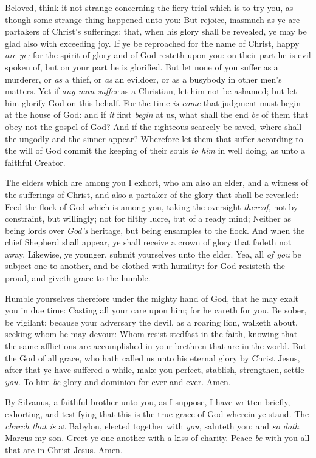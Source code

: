 \documentclass[11pt,letterpaper,oneside]{memoir}
\begin{document}
Beloved, think it not strange concerning the fiery trial which is to try
you, as though some strange thing happened unto you: But rejoice,
inasmuch as ye are partakers of Christ's sufferings; that, when his
glory shall be revealed, ye may be glad also with exceeding joy. If ye
be reproached for the name of Christ, happy \emph{are ye;} for the
spirit of glory and of God resteth upon you: on their part he is evil
spoken of, but on your part he is glorified. But let none of you suffer
as a murderer, or \emph{as} a thief, or \emph{as} an evildoer, or as a
busybody in other men's matters. Yet if \emph{any man suffer} as a
Christian, let him not be ashamed; but let him glorify God on this
behalf. For the time \emph{is come} that judgment must begin at the
house of God: and if \emph{it} first \emph{begin} at us, what shall the
end \emph{be} of them that obey not the gospel of God? And if the
righteous scarcely be saved, where shall the ungodly and the sinner
appear? Wherefore let them that suffer according to the will of God
commit the keeping of their souls \emph{to him} in well doing, as unto a
faithful Creator.

The elders which are among you I exhort, who am also an elder, and a
witness of the sufferings of Christ, and also a partaker of the glory
that shall be revealed: Feed the flock of God which is among you, taking
the oversight \emph{thereof,} not by constraint, but willingly; not for
filthy lucre, but of a ready mind; Neither as being lords over
\emph{God's} heritage, but being ensamples to the flock. And when the
chief Shepherd shall appear, ye shall receive a crown of glory that
fadeth not away. Likewise, ye younger, submit yourselves unto the elder.
Yea, all \emph{of you} be subject one to another, and be clothed with
humility: for God resisteth the proud, and giveth grace to the humble.

Humble yourselves therefore under the mighty hand of God, that he may
exalt you in due time: Casting all your care upon him; for he careth for
you. Be sober, be vigilant; because your adversary the devil, as a
roaring lion, walketh about, seeking whom he may devour: Whom resist
stedfast in the faith, knowing that the same afflictions are
accomplished in your brethren that are in the world. But the God of all
grace, who hath called us unto his eternal glory by Christ Jesus, after
that ye have suffered a while, make you perfect, stablish, strengthen,
settle \emph{you. }To him \emph{be} glory and dominion for ever and
ever. Amen.

By Silvanus, a faithful brother unto you, as I suppose, I have written
briefly, exhorting, and testifying that this is the true grace of God
wherein ye stand. The \emph{church that is} at Babylon, elected together
with \emph{you,} saluteth you; and \emph{so doth} Marcus my son. Greet
ye one another with a kiss of charity. Peace \emph{be} with you all that
are in Christ Jesus. Amen.
\end{document}
